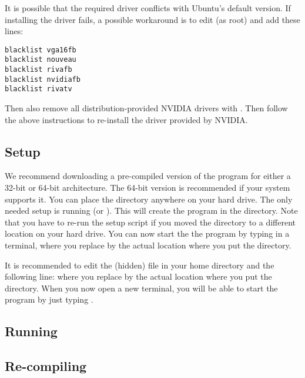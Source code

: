 It is possible that the required driver conflicts with Ubuntu's default version. If installing the driver fails, a possible workaround is to edit  (as root) and add these lines:
\small
\begin{verbatim}
blacklist vga16fb
blacklist nouveau
blacklist rivafb
blacklist nvidiafb
blacklist rivatv
\end{verbatim}
\normalsize

Then also remove all distribution-provided \textsc{NVIDIA} drivers with . Then follow the above instructions to re-install the driver provided by \textsc{NVIDIA}.


\subsection{Setup}

We recommend downloading a pre-compiled version of the program for either a 32-bit or 64-bit architecture. The 64-bit version is recommended if your system supports it. You can place the \prog directory anywhere on your hard drive. The only needed setup is running  (or ). This will create the \cmd{\prog} program in the  directory. Note that you have to re-run the setup 
script if you moved the \prog directory to a different location on your hard drive. You can now start the the program by typing  in a terminal, where you replace  by the actual location where you put the \prog directory.

It is recommended to edit the (hidden)  file in your home directory and the following line:  where you replace  by the actual location where you put the \prog directory. When you now open a new terminal, you will be able to start the program by just typing \prog.

\subsection{Running}



\subsection{Re-compiling}







